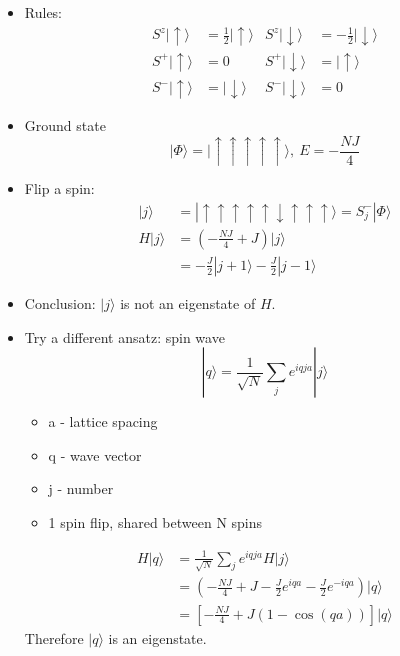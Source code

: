 \documentclass[a4paper, 11pt, normalem]{report}
\begin{document}
\begin{itemize}
    \item Rules:
        \begin{align}
            S^z|\uparrow\rangle &= \frac{1}{2}|\uparrow\rangle & S^z|\downarrow\rangle &= -\frac{1}{2}|\downarrow\rangle \\
            S^+|\uparrow\rangle &= 0 & S^+|\downarrow\rangle &= |\uparrow\rangle \\
            S^-|\uparrow\rangle &= |\downarrow\rangle & S^-|\downarrow\rangle &= 0
        \end{align}
    \item Ground state
        \begin{equation}
            |\Phi\rangle = |\uparrow\uparrow\uparrow\uparrow\uparrow\rangle,~ E = -\frac{NJ}{4}
        \end{equation}
    \item Flip a spin:
        \begin{align}
            |j\rangle &= |\uparrow\uparrow\uparrow\uparrow\uparrow\downarrow\uparrow\uparrow\uparrow\rangle = S_j^-|\Phi\rangle \\
            H|j\rangle &= \left(-\frac{NJ}{4} + J\right)|j\rangle \\
                       &= -\frac{J}{2}|j+1\rangle  - \frac{J}{2}|j-1\rangle
        \end{align}
    \item Conclusion: $|j\rangle$ is not an eigenstate of $H$.
    \item Try a different ansatz: spin wave
        \begin{equation}
            |q\rangle = \frac{1}{\sqrt{N}} \sum_j e^{iqja}|j\rangle
        \end{equation}
        \begin{itemize}
            \item a - lattice spacing
            \item q - wave vector
            \item j - number
            \item 1 spin flip, shared between N spins
        \end{itemize}
        \begin{align}
            H|q\rangle &= \frac{1}{\sqrt{N}} \sum_j e^{iqja}H|j\rangle \\
                       &= \left(-\frac{NJ}{4} + J - \frac{J}{2}e^{iqa} -\frac{J}{2}e^{-iqa}\right)|q\rangle \\
                       &= \left[-\frac{NJ}{4} + J(1-\cos(qa))\right]|q\rangle
        \end{align}
        Therefore $|q\rangle$ is an eigenstate.


\end{itemize}
\end{document}
